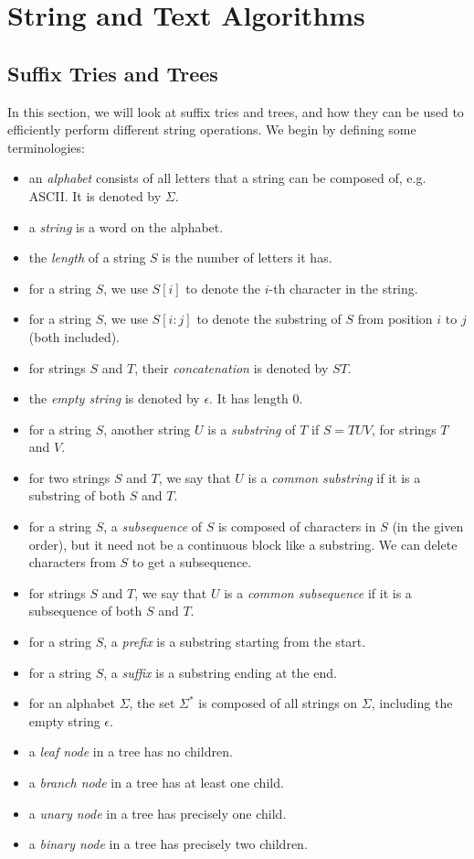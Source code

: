 \documentclass[a4paper, openany]{memoir}
\begin{document}
    \chapter{String and Text Algorithms}
    \section{Suffix Tries and Trees}
    In this section, we will look at suffix tries and trees, and how they can be used to efficiently perform different string operations. We begin by defining some terminologies:
    \begin{itemize}
        \item an \emph{alphabet} consists of all letters that a string can be composed of, e.g. ASCII. It is denoted by $\Sigma$.
        \item a \emph{string} is a word on the alphabet.
        \item the \emph{length} of a string $S$ is the number of letters it has.
        \item for a string $S$, we use $S[i]$ to denote the $i$-th character in the string.
        \item for a string $S$, we use $S[i:j]$ to denote the substring of $S$ from position $i$ to $j$ (both included).
        \item for strings $S$ and $T$, their \emph{concatenation} is denoted by $ST$.
        \item the \emph{empty string} is denoted by $\epsilon$. It has length $0$.
        \item for a string $S$, another string $U$ is a \emph{substring} of $T$ if $S = TUV$, for strings $T$ and $V$.
        \item for two strings $S$ and $T$, we say that $U$ is a \emph{common substring} if it is a substring of both $S$ and $T$.
        \item for a string $S$, a \emph{subsequence} of $S$ is composed of characters in $S$ (in the given order), but it need not be a continuous block like a substring. We can delete characters from $S$ to get a subsequence.
        \item for strings $S$ and $T$, we say that $U$ is a \emph{common subsequence} if it is a subsequence of both $S$ and $T$.
        \item for a string $S$, a \emph{prefix} is a substring starting from the start.
        \item for a string $S$, a \emph{suffix} is a substring ending at the end.
        \item for an alphabet $\Sigma$, the set $\Sigma^*$ is composed of all strings on $\Sigma$, including the empty string $\epsilon$.
        \item a \emph{leaf node} in a tree has no children.
        \item a \emph{branch node} in a tree has at least one child.
        \item a \emph{unary node} in a tree has precisely one child.
        \item a \emph{binary node} in a tree has precisely two children.
    \end{itemize}
\end{document}
